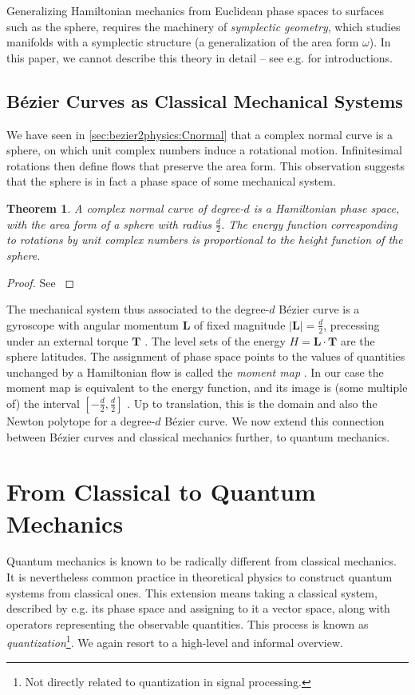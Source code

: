 \documentclass[12pt,final,3p]{elsarticle}
\newtheorem{theorem}{Theorem}
\begin{document}
Generalizing Hamiltonian mechanics from Euclidean phase spaces to surfaces such as the sphere, requires the machinery of \emph{symplectic geometry}, which studies manifolds with a symplectic structure (a generalization of the area form $\omega$). In this paper, we cannot describe this theory in detail  -- see e.g. \cite{mcduff2009what,arnold1990symplectic} for introductions.

\subsection{B\'{e}zier Curves as Classical Mechanical Systems}\label{sec:bezierclassical}
We have seen in \autoref{sec:bezier2physics:Cnormal} that a complex normal curve is a sphere, on which unit complex numbers induce a rotational motion. Infinitesimal rotations then define flows that preserve the area form. This observation suggests that the sphere is in fact a phase space of some mechanical system.
\begin{theorem}
	A complex normal curve of degree-$d$ is a Hamiltonian phase space, with the area form of a sphere with radius $\frac{d}{2}$. The energy function corresponding to rotations by unit complex numbers is proportional to the height function of the sphere.
\end{theorem}
\begin{proof}
	See \cite[Ch. 1.2]{da2003symplectic}
\end{proof}
The mechanical system thus associated to the degree-$d$ B\'{e}zier curve is a gyroscope with angular momentum $\mathbf{L}$ of fixed magnitude $\left| \mathbf{L} \right| = \frac{d}{2}$, precessing under  an external torque $\mathbf{T}$ \cite[Sec. 3]{stone1989supersymmetry}. The level sets of the energy $H = \mathbf{L} \cdot \mathbf{T}$ are the sphere latitudes. The assignment of phase space points to the values of quantities unchanged by a Hamiltonian flow is called the \emph{moment map} \cite{guillemin1994moment}. In our case the moment map is equivalent to the energy function, and its image is (some multiple of) the interval $[-\frac{d}{2}, \frac{d}{2}]$ \cite[Ch. 1.6]{da2003symplectic}. Up to translation, this is the domain and also the Newton polytope for a degree-$d$ B\'{e}zier curve. We now extend this connection between B\'ezier curves and classical mechanics further, to quantum mechanics.

\section{From Classical to Quantum Mechanics}\label{sec:bezierquantum}
Quantum mechanics is known to be radically different from classical mechanics. It is nevertheless common practice in theoretical physics to construct quantum systems from classical ones. This extension means taking a classical system, described by e.g. its phase space and assigning to it a vector space, along with operators representing the observable quantities. This process is known as \emph{quantization}\footnote{Not directly related to quantization in signal processing.}. We again resort to a high-level and informal overview.
\end{document}
